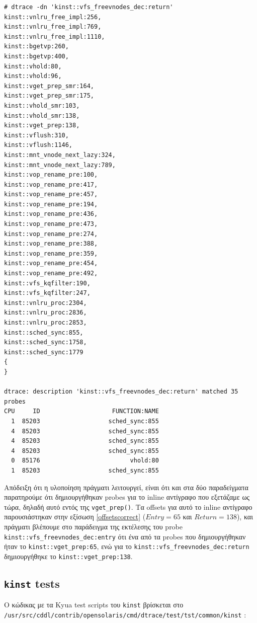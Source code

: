 \documentclass[12pt]{article}
\begin{document}
\begin{lstlisting}
# dtrace -dn 'kinst::vfs_freevnodes_dec:return'
kinst::vnlru_free_impl:256,
kinst::vnlru_free_impl:769,
kinst::vnlru_free_impl:1110,
kinst::bgetvp:260,
kinst::bgetvp:400,
kinst::vhold:80,
kinst::vhold:96,
kinst::vget_prep_smr:164,
kinst::vget_prep_smr:175,
kinst::vhold_smr:103,
kinst::vhold_smr:138,
kinst::vget_prep:138,
kinst::vflush:310,
kinst::vflush:1146,
kinst::mnt_vnode_next_lazy:324,
kinst::mnt_vnode_next_lazy:789,
kinst::vop_rename_pre:100,
kinst::vop_rename_pre:417,
kinst::vop_rename_pre:457,
kinst::vop_rename_pre:194,
kinst::vop_rename_pre:436,
kinst::vop_rename_pre:473,
kinst::vop_rename_pre:274,
kinst::vop_rename_pre:388,
kinst::vop_rename_pre:359,
kinst::vop_rename_pre:454,
kinst::vop_rename_pre:492,
kinst::vfs_kqfilter:190,
kinst::vfs_kqfilter:247,
kinst::vnlru_proc:2304,
kinst::vnlru_proc:2836,
kinst::vnlru_proc:2853,
kinst::sched_sync:855,
kinst::sched_sync:1758,
kinst::sched_sync:1779
{
}

dtrace: description 'kinst::vfs_freevnodes_dec:return' matched 35 probes
CPU     ID                    FUNCTION:NAME
  1  85203                   sched_sync:855
  4  85203                   sched_sync:855
  4  85203                   sched_sync:855
  4  85203                   sched_sync:855
  0  85176                         vhold:80
  1  85203                   sched_sync:855
\end{lstlisting}

Απόδειξη ότι η υλοποίηση πράγματι λειτουργεί, είναι ότι και στα δύο
παραδείγματα παρατηρούμε ότι δημιουργήθηκαν probes για το inline αντίγραφο που
εξετάζαμε ως τώρα, δηλαδή αυτό εντός της \lstinline{vget_prep()}. Τα offsets
για αυτό το inline αντίγραφο παρουσιάστηκαν στην εξίσωση \ref{offsetscorrect}
($Entry = 65$ και $Return = 138$), και πράγματι βλέπουμε στο παράδειγμα της
εκτέλεσης του probe \lstinline{kinst::vfs_freevnodes_dec:entry} ότι ένα από τα
probes που δημιουργήθηκαν ήταν το \lstinline{kinst::vget_prep:65}, ενώ για το
\lstinline{kinst::vfs_freevnodes_dec:return} δημιουργήθηκε το
\lstinline{kinst::vget_prep:138}.

\subsection{\lstinline{kinst} tests}

Ο κώδικας με τα Kyua test scripts του \lstinline{kinst} βρίσκεται στο
\lstinline{/usr/src/cddl/contrib/opensolaris/cmd/dtrace/test/tst/common/kinst}
\cite{testsrc}:
\end{document}

